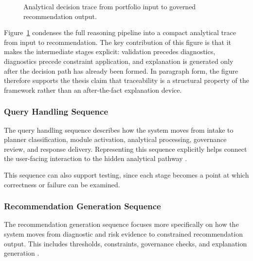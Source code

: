 \documentclass[11pt]{article}
\begin{document}
\begin{figure}[htbp]
\centering
{}
\caption[Analytical decision trace]{Analytical decision trace from portfolio input to governed recommendation output.}
\label{fig:analytic_trace}
\end{figure}

Figure~\ref{fig:analytic_trace} condenses the full reasoning pipeline into a compact analytical trace from input to recommendation. The key contribution of this figure is that it makes the intermediate stages explicit: validation precedes diagnostics, diagnostics precede constraint application, and explanation is generated only after the decision path has already been formed. In paragraph form, the figure therefore supports the thesis claim that traceability is a structural property of the framework rather than an after-the-fact explanation device.

\subsubsection{Query Handling Sequence}
The query handling sequence describes how the system moves from intake to planner classification, module activation, analytical processing, governance review, and response delivery. Representing this sequence explicitly helps connect the user-facing interaction to the hidden analytical pathway \cite{wu2023,yu2023,wooldridge2009}.

This sequence can also support testing, since each stage becomes a point at which correctness or failure can be examined.

\subsubsection{Recommendation Generation Sequence}
The recommendation generation sequence focuses more specifically on how the system moves from diagnostic and risk evidence to constrained recommendation output. This includes thresholds, constraints, governance checks, and explanation generation \cite{rockafellar2000,jagannathan2003,mifid2014}.
\end{document}
